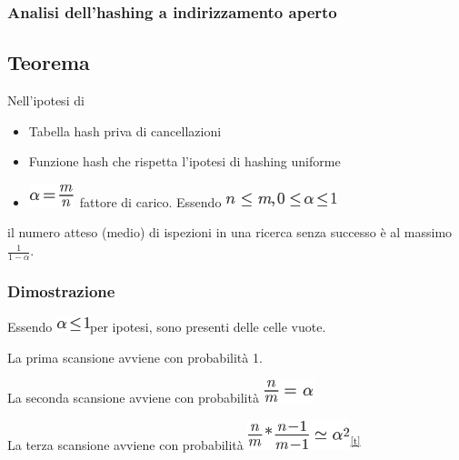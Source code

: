\documentclass{article}
\providecommand{\tightlist}{%
  \setlength{\itemsep}{0pt}\setlength{\parskip}{0pt}}
\begin{document}
{\hypertarget{h.wkyvylqq2lrt}{\subsubsection{\texorpdfstring{{Analisi dell'hashing a indirizzamento aperto}}{Analisi dell'hashing a indirizzamento aperto}}\label{h.wkyvylqq2lrt}}

{}

\subsection{Teorema}

{Nell'ipotesi di}

\begin{itemize}
\tightlist
\item
  {Tabella hash priva di cancellazioni}
\item
  {Funzione hash che rispetta l'ipotesi di hashing uniforme}
\item
  \includegraphics{images/image319.png}{~fattore di carico. Essendo
  }\includegraphics{images/image320.png}
\end{itemize}

{il numero atteso (medio) di ispezioni in una ricerca senza successo è al massimo }$\frac{1}{1-\alpha}${.}

\subsubsection{Dimostrazione}

{Essendo }\includegraphics{images/image322.png}{per ipotesi, sono presenti delle celle vuote.}

{La prima scansione avviene con probabilità 1.}

{La seconda scansione avviene con probabilità }\includegraphics{images/image323.png}

{La terza scansione avviene con probabilità }\includegraphics{images/image324.png}\textsuperscript{\protect\hyperlink{cmnt20}{{[}t{]}}}

}
\end{document}

